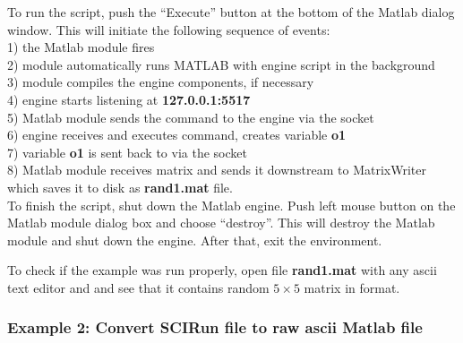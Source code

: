 To run the script, push the ``Execute'' button at the bottom of the
Matlab dialog window. This will initiate the following
sequence of events: \\
1) the Matlab module fires \\
2) module automatically runs MATLAB with engine script in the background  \\
3) module compiles the engine components, if necessary \\
4) engine starts listening at {\bf 127.0.0.1:5517} \\
5) Matlab module sends the command to the engine via the socket\\
6) engine receives and executes command, creates variable {\bf o1} \\
7) variable {\bf o1} is sent back to \sr{} via the socket \\
8) \sr{} Matlab module receives matrix and sends it downstream
   to MatrixWriter which saves it to disk as {\bf rand1.mat} file. \\

To finish the script, shut down the Matlab engine. 
Push left mouse button on the
Matlab module dialog box and choose ``destroy''. This will destroy
the Matlab module and shut down the engine. After that, exit
the \sr{} environment. 

To check if the example was run properly, open file {\bf rand1.mat }
with any ascii text editor and and see that it contains random
$5 \times 5$ matrix in \sr{} format. 

\subsubsection{Example 2: Convert SCIRun file to raw ascii Matlab file} \indent

